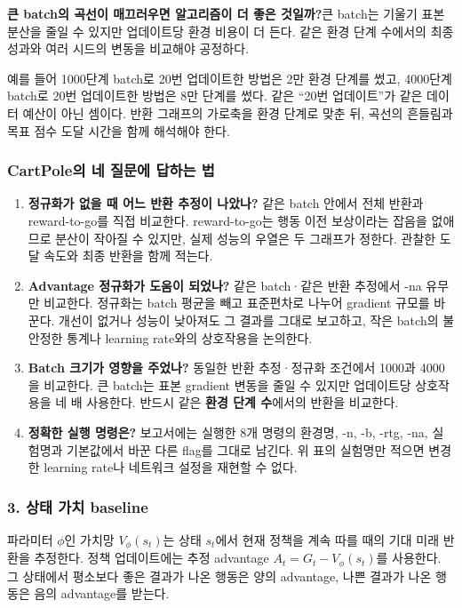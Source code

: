 \documentclass[11pt,a4paper]{article}
\begin{document}
\par\medskip\noindent\textbf{큰 batch의 곡선이 매끄러우면 알고리즘이 더 좋은 것일까?}\quad 큰 batch는 기울기 표본 분산을 줄일 수 있지만 업데이트당 환경 비용이 더 든다. 같은 환경 단계 수에서의 최종 성과와 여러 시드의 변동을 비교해야 공정하다.\par

예를 들어 1000단계 batch로 20번 업데이트한 방법은 2만 환경 단계를 썼고, 4000단계 batch로 20번 업데이트한 방법은 8만 단계를 썼다. 같은 “20번 업데이트”가 같은 데이터 예산이 아닌 셈이다. 반환 그래프의 가로축을 환경 단계로 맞춘 뒤, 곡선의 흔들림과 목표 점수 도달 시간을 함께 해석해야 한다.\par

\subsubsection{CartPole의 네 질문에 답하는 법}

\begin{enumerate}
\item \textbf{정규화가 없을 때 어느 반환 추정이 나았나?} 같은 batch 안에서 전체 반환과 reward-to-go를 직접 비교한다. reward-to-go는 행동 이전 보상이라는 잡음을 없애므로 분산이 작아질 수 있지만, 실제 성능의 우열은 두 그래프가 정한다. 관찰한 도달 속도와 최종 반환을 함께 적는다.
\item \textbf{Advantage 정규화가 도움이 되었나?} 같은 batch·같은 반환 추정에서 -na 유무만 비교한다. 정규화는 batch 평균을 빼고 표준편차로 나누어 gradient 규모를 바꾼다. 개선이 없거나 성능이 낮아져도 그 결과를 그대로 보고하고, 작은 batch의 불안정한 통계나 learning rate와의 상호작용을 논의한다.
\item \textbf{Batch 크기가 영향을 주었나?} 동일한 반환 추정·정규화 조건에서 1000과 4000을 비교한다. 큰 batch는 표본 gradient 변동을 줄일 수 있지만 업데이트당 상호작용을 네 배 사용한다. 반드시 같은 \textbf{환경 단계 수}에서의 반환을 비교한다.
\item \textbf{정확한 실행 명령은?} 보고서에는 실행한 8개 명령의 환경명, -n, -b, -rtg, -na, 실험명과 기본값에서 바꾼 다른 flag를 그대로 남긴다. 위 표의 실험명만 적으면 변경한 learning rate나 네트워크 설정을 재현할 수 없다.
\end{enumerate}

\subsubsection{3. 상태 가치 baseline}

파라미터 $\phi$인 가치망 $V_\phi(s_t)$는 상태 $s_t$에서 현재 정책을 계속 따를 때의 기대 미래 반환을 추정한다. 정책 업데이트에는 추정 advantage $A_t=G_t-V_\phi(s_t)$를 사용한다. 그 상태에서 평소보다 좋은 결과가 나온 행동은 양의 advantage, 나쁜 결과가 나온 행동은 음의 advantage를 받는다.\par
\end{document}
